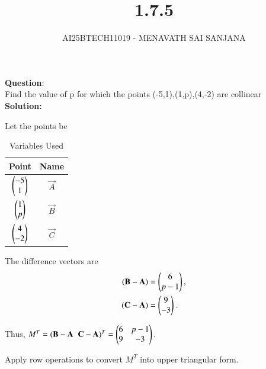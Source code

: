 \documentclass[journal]{IEEEtran}
\begin{document}

\vspace{3cm}

\title{1.7.5}
\author{AI25BTECH11019 - MENAVATH SAI SANJANA}
{\let\newpage\relax\maketitle}

\renewcommand{\thefigure}{\theenumi}
\renewcommand{\thetable}{\theenumi}
\setlength{\intextsep}{10pt} %


\renewcommand{\thetable}{\theenumi}

\textbf{Question}:\\
 Find the value of p for which the points (-5,1),(1,p),(4,-2) are collinear 
\\
\bigskip
\textbf{Solution: }

Let the points be

\begin{table}[h!]
\centering
\begin{tabular}{|c|c|}
\hline
\textbf{Point} & \textbf{Name} \\
\hline
$\begin{pmatrix}-5 \\ 1\end{pmatrix}$ & $\vec{A}$ \\
\hline
$\begin{pmatrix}1 \\ p\end{pmatrix}$ & $\vec{B}$ \\
\hline
$\begin{pmatrix}4 \\ -2\end{pmatrix}$ & $\vec{C}$ \\
\hline
\end{tabular}
\caption{Variables Used}
\end{table}



The difference vectors are
\begin{align}
(\mathbf{B}-\mathbf{A}) &= \begin{pmatrix}6 \\ p-1\end{pmatrix}, \\
(\mathbf{C}-\mathbf{A}) &= \begin{pmatrix}9 \\ -3\end{pmatrix}.
\end{align}

Thus,
$
M^T = (\mathbf{B}-\mathbf{A} \;\; \mathbf{C}-\mathbf{A})^T
= \begin{pmatrix}6 & p-1 \\ 9 & -3\end{pmatrix}.
$

Apply row operations to convert $M^T$ into upper triangular form.
\end{document}

